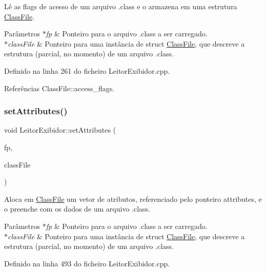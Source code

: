 Lê as flags de acesso de um arquivo .class e o armazena em uma estrutura \hyperlink{classClassFile}{Class\+File}. 
\begin{DoxyParams}{Parâmetros}
{\em $\ast$fp} & Ponteiro para o arquivo .class a ser carregado. \\
\hline
{\em $\ast$class\+File} & Ponteiro para uma instância de struct \hyperlink{classClassFile}{Class\+File}, que descreve a estrutura (parcial, no momento) de um arquivo .class. \\
\hline
\end{DoxyParams}


Definido na linha 261 do ficheiro Leitor\+Exibidor.\+cpp.



Referências Class\+File\+::access\+\_\+flags.

\mbox{\label{classLeitorExibidor_a988287e777377265b23482e307eb4a63}} 
\subsubsection{\texorpdfstring{set\+Attributes()}{setAttributes()}}
{\footnotesize\ttfamily void Leitor\+Exibidor\+::set\+Attributes (\begin{DoxyParamCaption}\item[{F\+I\+LE $\ast$}]{fp,  }\item[{\hyperlink{classClassFile}{Class\+File} $\ast$}]{class\+File }\end{DoxyParamCaption})\hspace{0.3cm}{\ttfamily [private]}}

Aloca em \hyperlink{classClassFile}{Class\+File} um vetor de atributos, referenciado pelo ponteiro attributes, e o preenche com os dados de um arquivo .class. 
\begin{DoxyParams}{Parâmetros}
{\em $\ast$fp} & Ponteiro para o arquivo .class a ser carregado. \\
\hline
{\em $\ast$class\+File} & Ponteiro para uma instância de struct \hyperlink{classClassFile}{Class\+File}, que descreve a estrutura (parcial, no momento) de um arquivo .class. \\
\hline
\end{DoxyParams}


Definido na linha 493 do ficheiro Leitor\+Exibidor.\+cpp.



